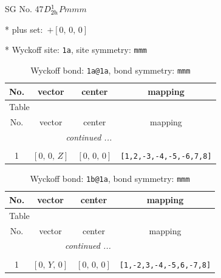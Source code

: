 \documentclass[fleqn,8pt]{jsarticle}
\begin{document}
\setcounter{MaxMatrixCols}{32}

\renewcommand{\tablename}{Table~}
\renewcommand{\figurename}{Figure~}
\begin{center}
\LARGE
SG No. 47\quad$D_{\rm 2h}^{1}$\quad$Pmmm$\quad[ orthorhombic ]
\end{center}

* plus set:\,\,\,$+\left[ 0,\, 0,\, 0 \right]$


* Wyckoff site: {\tt 1a}, site symmetry: {\tt mmm}
\renewcommand{\arraystretch}{1.2}
\begin{longtable}{cccc}
\caption{Wyckoff bond: {\tt 1a@1a}, bond symmetry: {\tt mmm}}
 \\
 \hline \hline
No. & vector & center & mapping \\ \hline \endfirsthead

\multicolumn{3}{l}{\tablename\ \thetable{}} \\
 \hline \hline
No. & vector & center & mapping \\ \hline \endhead

 \hline \hline
\multicolumn{3}{r}{\footnotesize\it continued ...} \\ \endfoot

 \hline \hline
\multicolumn{3}{r}{} \\ \endlastfoot

1 & $\left[ 0,\, 0,\, Z \right]$ & $\left[ 0,\, 0,\, 0 \right]$ & {\tt [1,2,-3,-4,-5,-6,7,8]} \\
\end{longtable}
\renewcommand{\arraystretch}{1.2}
\begin{longtable}{cccc}
\caption{Wyckoff bond: {\tt 1b@1a}, bond symmetry: {\tt mmm}}
 \\
 \hline \hline
No. & vector & center & mapping \\ \hline \endfirsthead

\multicolumn{3}{l}{\tablename\ \thetable{}} \\
 \hline \hline
No. & vector & center & mapping \\ \hline \endhead

 \hline \hline
\multicolumn{3}{r}{\footnotesize\it continued ...} \\ \endfoot

 \hline \hline
\multicolumn{3}{r}{} \\ \endlastfoot

1 & $\left[ 0,\, Y,\, 0 \right]$ & $\left[ 0,\, 0,\, 0 \right]$ & {\tt [1,-2,3,-4,-5,6,-7,8]} \\
\end{longtable}
\end{document}
